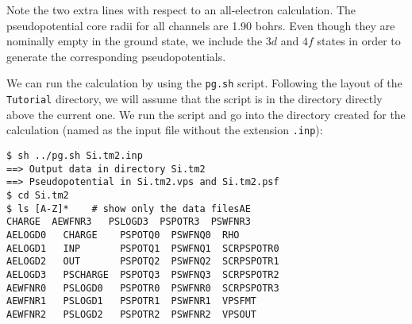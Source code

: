 \documentclass[11pt]{article}
\begin{document}
Note the two extra lines with respect to an all-electron calculation.
The pseudopotential core radii for all channels are 1.90 bohrs. Even
though they are nominally empty in the ground state, we include the
$3d$ and $4f$ states in order to generate the corresponding
pseudopotentials. 

We can run the calculation by using the {\tt pg.sh} script. Following
the layout of the {\tt Tutorial} directory, we will assume that the
script is in the directory directly above the current one. We run the
script and go into the directory created for the calculation (named
as the input file without the extension {\tt .inp}):

\begin{verbatim}
$ sh ../pg.sh Si.tm2.inp
==> Output data in directory Si.tm2
==> Pseudopotential in Si.tm2.vps and Si.tm2.psf
$ cd Si.tm2
$ ls [A-Z]*    # show only the data filesAE
CHARGE  AEWFNR3   PSLOGD3  PSPOTR3  PSWFNR3     
AELOGD0   CHARGE    PSPOTQ0  PSWFNQ0  RHO         
AELOGD1   INP       PSPOTQ1  PSWFNQ1  SCRPSPOTR0  
AELOGD2   OUT       PSPOTQ2  PSWFNQ2  SCRPSPOTR1  
AELOGD3   PSCHARGE  PSPOTQ3  PSWFNQ3  SCRPSPOTR2  
AEWFNR0   PSLOGD0   PSPOTR0  PSWFNR0  SCRPSPOTR3  
AEWFNR1   PSLOGD1   PSPOTR1  PSWFNR1  VPSFMT      
AEWFNR2   PSLOGD2   PSPOTR2  PSWFNR2  VPSOUT      
\end{verbatim}
\end{document}
